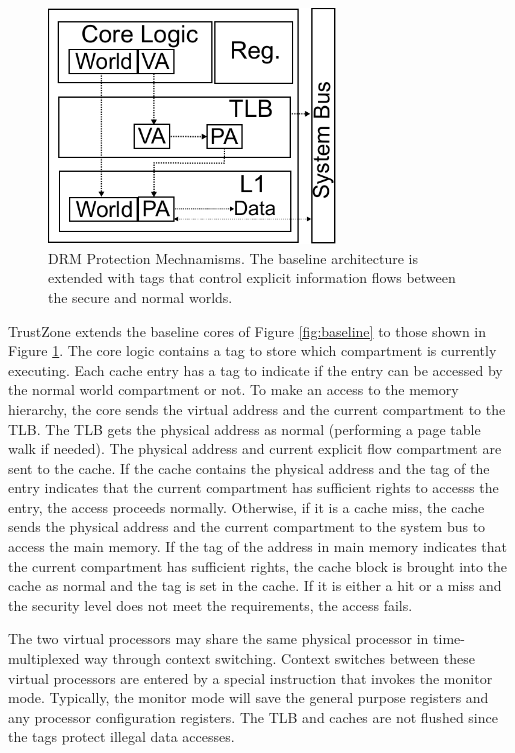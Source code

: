     \begin{figure}
        \begin{center}
            \includegraphics[width=3in]{figs/tz_tags.pdf}
            \caption{DRM Protection Mechnamisms. The baseline architecture is 
            extended with tags that control explicit information flows between 
        the secure and normal worlds.}
            \label{fig:tz_uarch}
        \end{center}
    \end{figure}

    TrustZone extends the baseline cores of Figure \ref{fig:baseline} to
    those shown in Figure \ref{fig:tz_uarch}. The core logic contains a tag to 
    store which compartment is currently executing. Each cache entry has a tag to 
    indicate if the entry can be accessed by the normal world compartment or not. To make 
    an access to the memory hierarchy, the core sends the virtual address and 
    the current compartment to the TLB. The TLB gets the physical address as normal 
    (performing a page table walk if needed). The physical address and current 
    explicit flow compartment are sent to the cache. If the cache contains the 
    physical address and the tag of the entry indicates that the current 
    compartment 
    has sufficient rights to accesss the entry, the access proceeds normally.  
    Otherwise, if it is a cache miss, the cache sends the physical address and 
    the current compartment to the system bus to access the main memory. If the tag 
    of the address in main memory indicates that the current compartment has 
    sufficient rights, the cache block is brought into the cache as normal and 
    the tag is set in the cache. If it is either a hit or a miss and the 
    security level does not meet the requirements, the access fails.

    The two virtual processors may share the same physical processor in 
    time-multiplexed way through context switching. Context switches between 
    these virtual processors are entered by a special instruction that invokes 
    the monitor mode.  Typically, the monitor mode will save the general 
    purpose registers and any processor configuration registers. The TLB and 
    caches are not flushed since the tags protect illegal data accesses.

